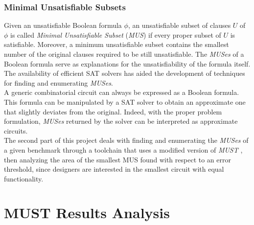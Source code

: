 \documentclass[]{usiinfbachelorproject}
\begin{document}

\subsubsection{Minimal Unsatisfiable Subsets}\label{subsubsec:mus}
Given an unsatisfiable Boolean formula $\phi$, an unsatisfiable subset of clauses $U$ of $\phi$ is called \textit{Minimal Unsatisfiable Subset} (\textit{MUS}) if every proper subset of $U$ is satisfiable. Moreover, a minimum unsatisfiable subset contains the smallest number of the original clauses required to be still unsatisfiable. The \textit{MUSes} of a Boolean formula serve as explanations for the unsatisfiability of the formula itself. The availability of efficient SAT solvers has aided the development of techniques for finding and enumerating \textit{MUSes}. \\
A generic combinatorial circuit can always be expressed as a Boolean formula. This formula can be manipulated by a SAT solver to obtain an approximate one that slightly deviates from the original. Indeed, with the proper problem formulation, \textit{MUSes} returned by the solver can be interpreted as approximate circuits. \\
The second part of this project deals with finding and enumerating the \textit{MUSes} of a given benchmark through a toolchain that uses a modified version of \textit{MUST} \cite{mus}, then analyzing the area of the smallest MUS found with respect to an error threshold, since designers are interested in the smallest circuit with equal functionality.

\newpage

\section{MUST Results Analysis}\label{sec:results}

\end{document}
